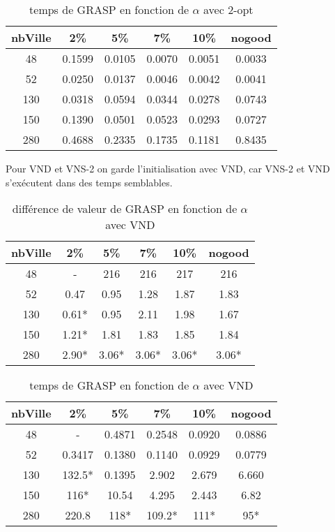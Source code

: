 \documentclass[12pt,a4paper]{article}
\begin{document}
\begin{table}[!h]
\centering
\begin{tabular}{|*{6}{c|}}
  \hline
  nbVille & 2\% & 5\% & 7\% & 10\% & nogood \\
  \hline
  48 & 0.1599 & 0.0105 & 0.0070 & 0.0051 & 0.0033 \\ 
  52 & 0.0250 & 0.0137 & 0.0046 & 0.0042 & 0.0041 \\
  130 & 0.0318 & 0.0594 & 0.0344 & 0.0278 & 0.0743 \\
  150 & 0.1390 & 0.0501 & 0.0523 & 0.0293 & 0.0727 \\  
  280 & 0.4688 & 0.2335 & 0.1735 & 0.1181 & 0.8435 \\
  \hline
\end{tabular}
\caption{temps de GRASP en fonction de $\alpha$ avec 2-opt}
\label{recherchelocaleGRASPtemps2optproba}
\end{table}

Pour VND et VNS-2 on garde l'initialisation avec VND, car VNS-2 et VND s’exécutent dans des temps semblables.

\begin{table}[!h]
\centering
\begin{tabular}{|*{6}{c|}}
  \hline
  nbVille & 2\% & 5\% & 7\% & 10\% & nogood \\
  \hline
  48 & - & 216 & 216 & 217 & 216 \\
  52 & 0.47 & 0.95 & 1.28 & 1.87 & 1.83 \\
  130 & 0.61* & 0.95 & 2.11 & 1.98 & 1.67 \\
  150 & 1.21* & 1.81 & 1.83 & 1.85 & 1.84 \\
  280 & 2.90* & 3.06* & 3.06* & 3.06* & 3.06* \\
  \hline
\end{tabular}
\caption{différence de valeur de GRASP en fonction de $\alpha$ avec VND}
\label{recherchelocaleGRASPtempsVNDproba}
\end{table}

\begin{table}[!h]
\centering
\begin{tabular}{|*{6}{c|}}
  \hline
  nbVille & 2\% & 5\% & 7\% & 10\% & nogood \\
  \hline
  48 & - & 0.4871 & 0.2548 & 0.0920 & 0.0886 \\
  52 & 0.3417 & 0.1380 & 0.1140 & 0.0929 & 0.0779 \\
  130 & 132.5* & 0.1395 & 2.902 & 2.679 & 6.660 \\
  150 & 116* & 10.54 & 4.295 & 2.443 & 6.82 \\
  280 & 220.8 & 118* & 109.2* & 111* & 95* \\
  \hline
\end{tabular}
\caption{temps de GRASP en fonction de $\alpha$ avec VND}
\label{recherchelocaleGRASPvalVNSproba}
\end{table}
\end{document}
